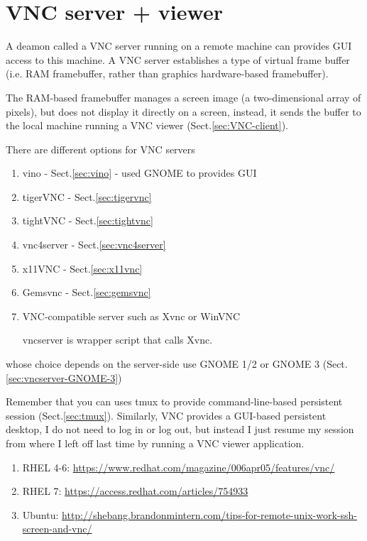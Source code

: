 \section{VNC server + viewer}
\label{sec:VNC-server}

A deamon called a VNC server running on a remote machine can provides GUI access
to this machine. A VNC server establishes a type of virtual frame buffer (i.e.
RAM framebuffer, rather than graphics hardware-based framebuffer).

The RAM-based framebuffer manages a screen image (a two-dimensional array of
pixels), but does not display it directly on a screen, instead, it sends the
buffer to the local machine running a VNC viewer (Sect.\ref{sec:VNC-client}).

There are different options for VNC servers
\begin{enumerate}
  \item vino - Sect.\ref{sec:vino} - used GNOME to provides GUI

  \item tigerVNC - Sect.\ref{sec:tigervnc}
  
  \item tightVNC - Sect.\ref{sec:tightvnc}
  
  \item vnc4server - Sect.\ref{sec:vnc4server}
  
  \item x11VNC - Sect.\ref{sec:x11vnc}
  
  \item Gemsvnc - Sect.\ref{sec:gemsvnc}
  
  \item VNC-compatible server such as Xvnc or WinVNC
  
   vncserver is wrapper script that calls Xvnc. 
\end{enumerate}
whose choice depends on the server-side use GNOME 1/2 or GNOME 3
(Sect.\ref{sec:vncserver-GNOME-3})

Remember that you can uses tmux to provide command-line-based persistent session
(Sect.\ref{sec:tmux}). Similarly, VNC provides a GUI-based persistent desktop, I
do not need to log in or log out, but instead I just resume my session from
where I left off last time by running a VNC viewer application.

\begin{enumerate}
  \item RHEL 4-6: \url{https://www.redhat.com/magazine/006apr05/features/vnc/}

  \item RHEL 7: \url{https://access.redhat.com/articles/754933}

  \item Ubuntu:
\url{http://shebang.brandonmintern.com/tips-for-remote-unix-work-ssh-screen-and-vnc/}
\end{enumerate}


